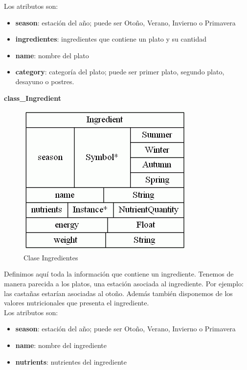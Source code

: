 \documentclass[12]{article}
\begin{document}
Los atributos son:
\begin{itemize}
\item \textbf{season}: estación del año; puede ser Otoño, Verano, Invierno o Primavera
\item \textbf{ingredientes}: ingredientes que contiene un plato y su cantidad
\item \textbf{name}: nombre del plato
\item \textbf{category}: categoría del plato; puede ser primer plato, segundo plato, desayuno o postres. 
\end{itemize}


\vspace{0.5cm}

\textbf{class\_Ingredient}
\begin{figure}[H]
\centering
\includegraphics[scale=0.5]{images/classIngredient.png}
\caption{Clase Ingredientes}
\label{ingredientes}
\end{figure}

Definimos aquí toda la información que contiene un ingrediente. Tenemos de manera parecida a los platos, una estación asociada al ingrediente. Por ejemplo: las castañas estarían asociadas al otoño. Además también disponemos de los valores nutricionales que presenta el ingrediente.
\\

Los atributos son: 

\begin{itemize}
\item \textbf{season}: estación del año; puede ser Otoño, Verano, Invierno o Primavera
\item \textbf{name}: nombre del ingrediente
\item \textbf{nutrients}: nutrientes del ingrediente
\end{itemize}
\end{document}
